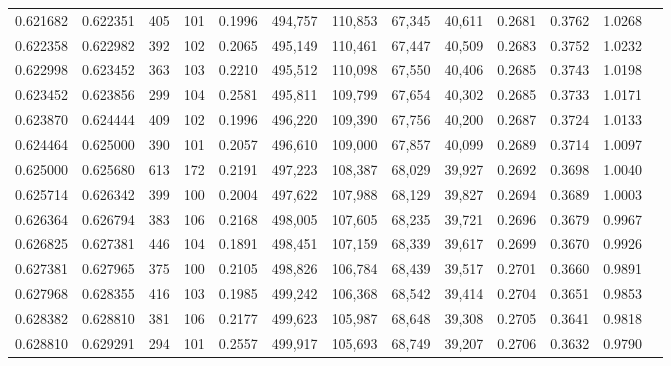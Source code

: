 \begin{tabular}{rrrrrrrrrrrrr}
0.621682 & 0.622351 &    405 &   101 &                                     0.1996 & 494,757 & 110,853 &  67,345 &  40,611 & 0.2681 & 0.3762 & 1.0268 \\
0.622358 & 0.622982 &    392 &   102 &                                     0.2065 & 495,149 & 110,461 &  67,447 &  40,509 & 0.2683 & 0.3752 & 1.0232 \\
0.622998 & 0.623452 &    363 &   103 &                                     0.2210 & 495,512 & 110,098 &  67,550 &  40,406 & 0.2685 & 0.3743 & 1.0198 \\
0.623452 & 0.623856 &    299 &   104 &                                     0.2581 & 495,811 & 109,799 &  67,654 &  40,302 & 0.2685 & 0.3733 & 1.0171 \\
0.623870 & 0.624444 &    409 &   102 &                                     0.1996 & 496,220 & 109,390 &  67,756 &  40,200 & 0.2687 & 0.3724 & 1.0133 \\
0.624464 & 0.625000 &    390 &   101 &                                     0.2057 & 496,610 & 109,000 &  67,857 &  40,099 & 0.2689 & 0.3714 & 1.0097 \\
0.625000 & 0.625680 &    613 &   172 &                                     0.2191 & 497,223 & 108,387 &  68,029 &  39,927 & 0.2692 & 0.3698 & 1.0040 \\
0.625714 & 0.626342 &    399 &   100 &                                     0.2004 & 497,622 & 107,988 &  68,129 &  39,827 & 0.2694 & 0.3689 & 1.0003 \\
0.626364 & 0.626794 &    383 &   106 &                                     0.2168 & 498,005 & 107,605 &  68,235 &  39,721 & 0.2696 & 0.3679 & 0.9967 \\
0.626825 & 0.627381 &    446 &   104 &                                     0.1891 & 498,451 & 107,159 &  68,339 &  39,617 & 0.2699 & 0.3670 & 0.9926 \\
0.627381 & 0.627965 &    375 &   100 &                                     0.2105 & 498,826 & 106,784 &  68,439 &  39,517 & 0.2701 & 0.3660 & 0.9891 \\
0.627968 & 0.628355 &    416 &   103 &                                     0.1985 & 499,242 & 106,368 &  68,542 &  39,414 & 0.2704 & 0.3651 & 0.9853 \\
0.628382 & 0.628810 &    381 &   106 &                                     0.2177 & 499,623 & 105,987 &  68,648 &  39,308 & 0.2705 & 0.3641 & 0.9818 \\
0.628810 & 0.629291 &    294 &   101 &                                     0.2557 & 499,917 & 105,693 &  68,749 &  39,207 & 0.2706 & 0.3632 & 0.9790 \\

\end{tabular}
